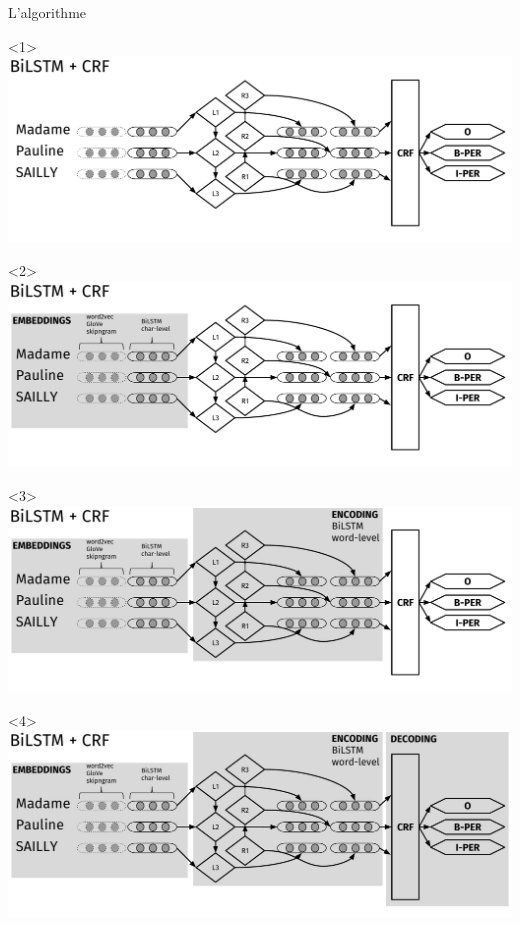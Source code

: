 \documentclass[10pt]{beamer}
\begin{document}
\begin{frame}{L'algorithme}
\vspace{2cm}
\begin{onlyenv}<1>\vspace*{\fill}\includegraphics[width=1\linewidth]{"img/bilstm"}\vspace*{\fill}\end{onlyenv}
\begin{onlyenv}<2>\vspace*{\fill}\includegraphics[width=1\linewidth]{"img/bilstm1"}\vspace*{\fill}\end{onlyenv}
\begin{onlyenv}<3>\vspace*{\fill}\includegraphics[width=1\linewidth]{"img/bilstm2"}\vspace*{\fill}\end{onlyenv}
\begin{onlyenv}<4>\vspace*{\fill}\includegraphics[width=1\linewidth]{"img/bilstm3"}\vspace*{\fill}\end{onlyenv}
	


\end{frame}
\end{document}
